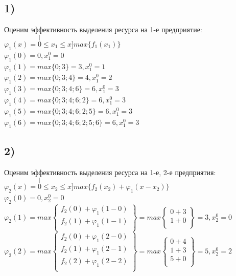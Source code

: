 \subsection*{1)} Оценим эффективность выделения ресурса на 1-е предприятие:\\
$\varphi_1(x) = \stackrel[0 \le x_1 \le x]{}{max}  \{f_1(x_1)\}$\\
$\varphi_1(0) = 0, x_1^0 = 0$\\
$\varphi_1(1) = max\{0; 3\} = 3, x_1^0 = 1$\\
$\varphi_1(2) = max\{0; 3; 4\} = 4, x_1^0 = 2$\\
$\varphi_1(3) = max\{0; 3; 4; 6\} = 6, x_1^0 = 3$\\
$\varphi_1(4) = max\{0; 3; 4; 6; 2\} = 6, x_1^0 = 3$\\
$\varphi_1(5) = max\{0; 3; 4; 6; 2; 5\} = 6, x_1^0 = 3$\\
$\varphi_1(6) = max\{0; 3; 4; 6; 2; 5; 6\} = 6, x_1^0 = 3$\\

\subsection*{2)} Оценим эффективность выделения ресурса на 1-е, 2-е предприятия:\\
$\varphi_2(x) = \stackrel[0 \le x_2 \le x]{}{max}  \{f_2(x_2) + \varphi_1(x - x_2)\}$\\

$\varphi_2(0) = 0, x_2^0 = 0$\\

$\varphi_2(1) = max \begin{Bmatrix}
    f_2(0) + \varphi_1(1 - 0) \\
    f_2(1) + \varphi_1(1 - 1) \\
\end{Bmatrix} = max \begin{Bmatrix}
    0 + 3 \\
    1 + 0 \\
\end{Bmatrix} = 3, x_2^0 = 0$\\

$\varphi_2(2) = max \begin{Bmatrix}
    f_2(0) + \varphi_1(2 - 0) \\
    f_2(1) + \varphi_1(2 - 1) \\
    f_2(2) + \varphi_1(2 - 2) \\
\end{Bmatrix} = max \begin{Bmatrix}
    0 + 4 \\
    1 + 3 \\
    5 + 0 \\
\end{Bmatrix} = 5, x_2^0 = 2$\\

